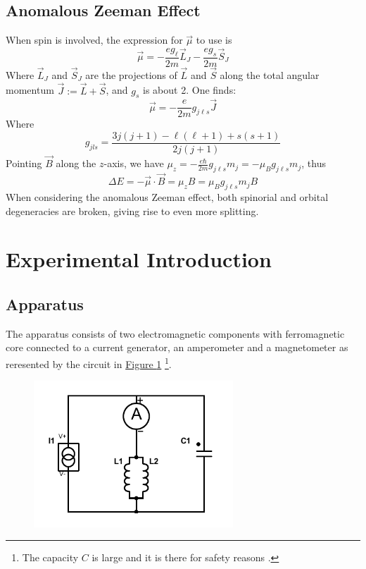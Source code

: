 \documentclass[a4paper,12pt,abstracton]{scrartcl}
\begin{document}
\subsection{Anomalous Zeeman Effect}
When spin is involved, the expression for $\vec{\mu}$ to use is 
\begin{equation}
\vec{\mu}=-\frac{eg_\ell}{2m} \vec{L}_J - \frac{eg_s}{2m} \vec{S}_J
\end{equation}
Where $\vec{L}_J$ and $ \vec{S}_J$ are the projections of $\vec{L}$ and $\vec{S}$ along the total angular momentum $\vec{J}:= \vec{L}+ \vec{S}$, and $g_s$ is about 2. One finds:
\begin{equation}
\vec{\mu} = -\frac{e}{2m}g_{j\ell s}\vec{J}
\end{equation}
Where 
\begin{equation}
g_{jls}=\frac{3j(j+1)-\ell(\ell+1)+s(s+1)}{2j(j+1)}
\end{equation}
Pointing $\vec{B}$ along the $z$-axis, we have $\mu_z =-\frac{e \hbar}{2m}g_{j\ell s}m_j=-\mu_B g_{j\ell s}m_j$, thus
\begin{equation}
\Delta E = -\vec{\mu}\cdot \vec{B}= \mu_z B = \mu_Bg_{j\ell s}m_j B
\end{equation}
When considering the anomalous Zeeman effect, both spinorial and orbital degeneracies are broken, giving rise to even more splitting.

\section{Experimental Introduction}\label{sec: ExpIntro}

\subsection{Apparatus}
The apparatus consists of two electromagnetic components with ferromagnetic core connected to a current generator, an amperometer and a magnetometer as reresented by the circuit in \hyperref[fig: circuit]{Figure \ref*{fig: circuit}} \footnote{The capacity $C$ is large and it is there for safety reasons .}.
\begin{figure}[H]
\centering
\includegraphics[trim=0cm 0cm 0cm 0cm,clip,width=7.5cm,keepaspectratio]{images/circuito.pdf} 
\caption{}
\label{fig: circuit}
\end{figure}
\end{document}

